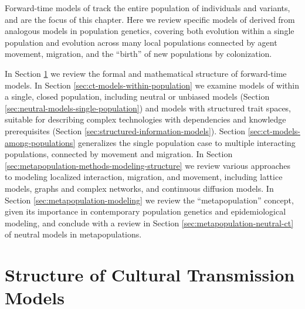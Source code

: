 \begin{description}[leftmargin=-1\labelwidth]
\item[\textsc{Overview}] Forward-time models of \ct track the entire population of individuals and variants, and are the focus of this chapter.  Here we review specific models of \ct derived from analogous models in population genetics, covering both evolution within a single population and evolution across many local populations connected by agent movement, migration, and the ``birth'' of new populations by colonization.  

\item[\textsc{Contents}] In Section \ref{sec:structure-ct-models} we review the formal and mathematical structure of forward-time \ct models.  In Section \ref{sec:ct-models-within-population} we examine models of \ct within a single, closed population, including neutral or unbiased models (Section \ref{sec:neutral-models-single-population}) and models with structured trait spaces, suitable for describing complex technologies with dependencies and knowledge prerequisites (Section \ref{sec:structured-information-models}).  Section \ref{sec:ct-models-among-populations} generalizes the single population case to multiple interacting populations, connected by movement and migration.  In Section \ref{sec:metapopulation-methods-modeling-structure} we review various approaches to modeling localized interaction, migration, and movement, including lattice models, graphs and complex networks, and continuous diffusion models.  In Section \ref{sec:metapopulation-modeling} we review the ``metapopulation'' concept, given its importance in contemporary population genetics and epidemiological modeling, and conclude with a review in  Section \ref{sec:metapopulation-neutral-ct} of neutral models in metapopulations.  
\end{description}




\section{Structure of Cultural Transmission Models}
\label{sec:structure-ct-models}



